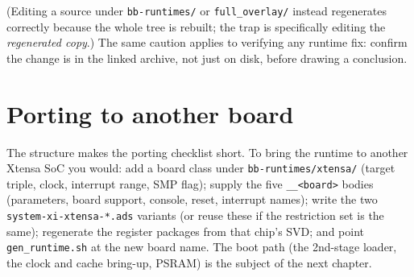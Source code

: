 (Editing a source under \texttt{bb-runtimes/} or \texttt{full\_overlay/} instead
regenerates correctly because the whole tree is rebuilt; the trap is specifically
editing the \emph{regenerated copy}.) The same caution applies to verifying any
runtime fix: confirm the change is in the linked archive, not just on disk,
before drawing a conclusion.

\section{Porting to another board}

The structure makes the porting checklist short. To bring the runtime to another
Xtensa SoC you would: add a board class under \texttt{bb-runtimes/xtensa/} (target
triple, clock, interrupt range, SMP flag); supply the five \texttt{\_\_<board>}
bodies (parameters, board support, console, reset, interrupt names); write the
two \texttt{system-xi-xtensa-*.ads} variants (or reuse these if the restriction
set is the same); regenerate the register packages from that chip's SVD; and
point \texttt{gen\_runtime.sh} at the new board name. The boot path (the
2nd-stage loader, the clock and cache bring-up, PSRAM) is the subject of the
next chapter.
